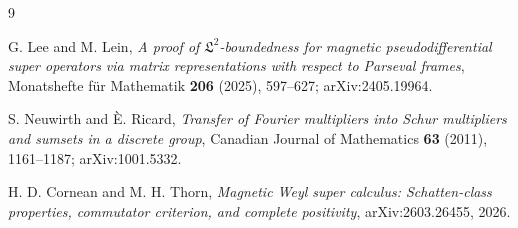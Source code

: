 \documentclass[11pt]{article}
\begin{document}
\begin{thebibliography}{9}

G. Lee and M. Lein,
\emph{A proof of $\mathfrak L^2$-boundedness for magnetic pseudodifferential
super operators via matrix representations with respect to Parseval frames},
Monatshefte f\"ur Mathematik \textbf{206} (2025), 597--627;
arXiv:2405.19964.

S. Neuwirth and \`E. Ricard,
\emph{Transfer of Fourier multipliers into Schur multipliers and sumsets in a
discrete group}, Canadian Journal of Mathematics \textbf{63} (2011),
1161--1187; arXiv:1001.5332.

H. D. Cornean and M. H. Thorn,
\emph{Magnetic Weyl super calculus: Schatten-class properties, commutator
criterion, and complete positivity}, arXiv:2603.26455, 2026.

\end{thebibliography}
\end{document}
